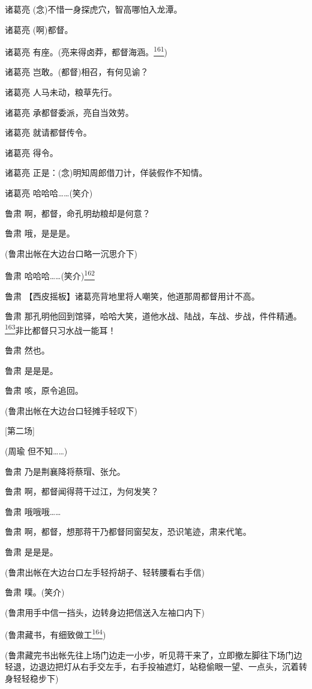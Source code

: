诸葛亮 (念)不惜一身探虎穴，智高哪怕入龙潭。

诸葛亮 (啊)都督。

诸葛亮
有座。(亮来得卤莽，都督海涵。\protect\hyperlink{fn161}{\textsuperscript{161}})

诸葛亮 岂敢。(都督)相召，有何见谕？

诸葛亮 人马未动，粮草先行。

诸葛亮 承都督委派，亮自当效劳。

诸葛亮 就请都督传令。

诸葛亮 得令。

诸葛亮 正是：(念)明知周郎借刀计，佯装假作不知情。

诸葛亮 哈哈哈\ldots{}\ldots{}(笑介)

鲁肃 啊，都督，命孔明劫粮却是何意？

鲁肃 哦，是是是。

(鲁肃出帐在大边台口略一沉思介下)

鲁肃
哈哈哈\ldots{}\ldots{}(笑介)\protect\hyperlink{fn162}{\textsuperscript{162}}

鲁肃 【西皮摇板】诸葛亮背地里将人嘲笑，他道那周都督用计不高。

鲁肃
那孔明他回到馆驿，哈哈大笑，道他水战、陆战，车战、步战，件件精通。\protect\hyperlink{fn163}{\textsuperscript{163}}非比都督只习水战一能耳！

鲁肃 然也。

鲁肃 是是是。

鲁肃 咳，原令追回。

(鲁肃出帐在大边台口轻摊手轻叹下)

{[}第二场{]}

(周瑜 但不知\ldots{}\ldots{})

鲁肃 乃是荆襄降将蔡瑁、张允。

鲁肃 啊，都督闻得蒋干过江，为何发笑？

鲁肃 哦哦哦\ldots{}\ldots{}

鲁肃 啊，都督，想那蒋干乃都督同窗契友，恐识笔迹，肃来代笔。

鲁肃 是是是。

(鲁肃出帐在大边台口左手轻捋胡子、轻转腰看右手信)

鲁肃 噗。(笑介)

(鲁肃用手中信一挡头，边转身边把信送入左袖口内下)

(鲁肃藏书，有细致做工\protect\hyperlink{fn164}{\textsuperscript{164}})

(鲁肃藏完书出帐先往上场门边走一小步，听见蒋干来了，立即撤左脚往下场门边轻退，边退边把灯从右手交左手，右手投袖遮灯，站稳偷眼一望、一点头，沉着转身轻轻稳步下)

